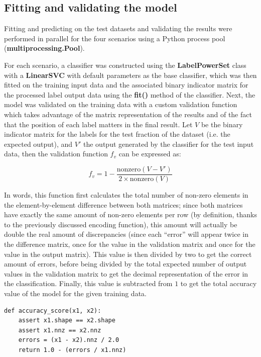 \documentclass{kthreport}
\theoremstyle{definition}
\begin{document}
\subsection{Fitting and validating the model}

Fitting and predicting on the test datasets and validating the results were performed in parallel for the four scenarios using a Python process pool (\textbf{multiprocessing.Pool}). 

For each scenario, a classifier was constructed using the \textbf{LabelPowerSet} class with a \textbf{LinearSVC} with default parameters as the base classifier, which was then fitted on the training input data and the associated binary indicator matrix for the processed label output data using the \textbf{fit()} method of the classifier.
Next, the model was validated on the training data with a custom validation function which takes advantage of the matrix representation of the results and of the fact that the position of each label matters in the final result. Let $V$ be the binary indicator matrix for the labels for the test fraction of the dataset (i.e. the expected output), and $V'$ the output generated by the classifier for the test input data, then the validation function $f_{v}$ can be expressed as:

\begin{equation}
    f_{v} = 1 - \frac{\text{nonzero}(V - V')}{2 \times \text{nonzero}(V)}
\end{equation}

In words, this function first calculates the total number of non-zero elements in the element-by-element difference between both matrices; since both matrices have exactly the same amount of non-zero elements per row (by definition, thanks to the previously discussed encoding function), this amount will actually be double the real amount of discrepancies (since each ``error'' will appear twice in the difference matrix, once for the value in the validation matrix and once for the value in the output matrix).
This value is then divided by two to get the correct amount of errors, before being divided by the total expected number of output values in the validation matrix to get the decimal representation of the error in the classification.
Finally, this value is subtracted from $1$ to get the total accuracy value of the model for the given training data. 

\begin{lstlisting}[style=MyPython, caption={Accuracy score function implemented in Python}]
def accuracy_score(x1, x2):
	assert x1.shape == x2.shape
	assert x1.nnz == x2.nnz
	errors = (x1 - x2).nnz / 2.0
	return 1.0 - (errors / x1.nnz)
\end{lstlisting}
\end{document}
